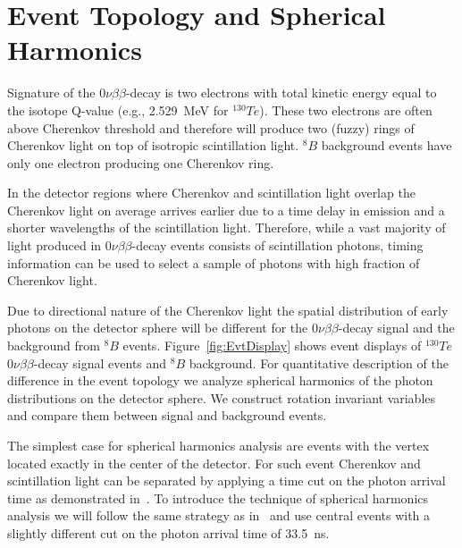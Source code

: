 \documentclass[12pt,twoside,letterpaper]{article}
\newcommand{\vbb}{0\nu\beta\beta}
\newcommand{\Te}{^{130}Te}
\newcommand{\B}{^{8}B}
\begin{document}
\section{Event Topology and Spherical Harmonics}
Signature of the $\vbb$-decay is two electrons with total kinetic energy equal to the isotope Q-value (e.g., 2.529~MeV for $\Te$). These two electrons are often above Cherenkov threshold and therefore will produce two (fuzzy) rings of Cherenkov light on top of isotropic scintillation light. $\B$ background events have only one electron producing one Cherenkov ring.

In the detector regions where Cherenkov and scintillation light overlap the Cherenkov light on average arrives earlier due to a time delay in emission and a shorter wavelengths of the scintillation light. Therefore, while a vast majority of light produced in $\vbb$-decay events consists of scintillation photons, timing information can be used to select a sample of photons with high fraction of Cherenkov light.

Due to directional nature of the Cherenkov light the spatial distribution of early photons on the detector sphere will be different for the $\vbb$-decay signal and the background from $\B$ events. Figure~\ref{fig:EvtDisplay} shows event displays of $\Te$ $\vbb$-decay signal events and $\B$ background. For quantitative description of the difference in the event topology we analyze spherical harmonics of the photon distributions on the detector sphere. We construct rotation invariant variables and compare them between signal and background events.

The simplest case for spherical harmonics analysis are events with the vertex located exactly in the center of the detector. For such event Cherenkov and scintillation light can be separated by applying a time cut on the photon arrival time as demonstrated in~\cite{Directionality}. To introduce the technique of spherical harmonics analysis we will follow the same strategy as in~\cite{Directionality} and use central events with a slightly different cut on the photon arrival time of 33.5~ns.
\end{document}
